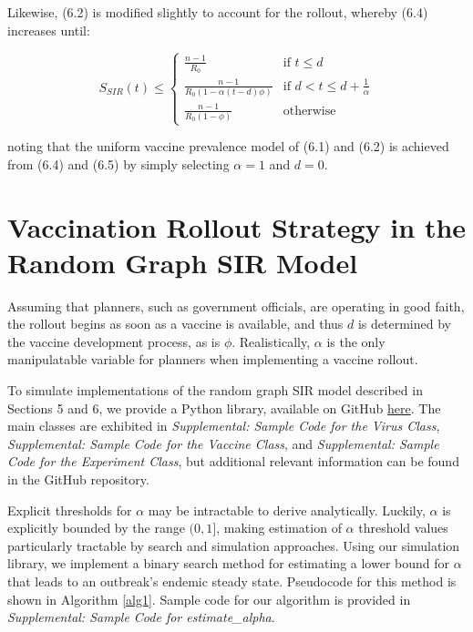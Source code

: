 \documentclass[psamsfonts]{amsart}
\theoremstyle{definition}
\theoremstyle{remark}
\numberwithin{equation}{section}
\begin{document}
Likewise, (6.2) is modified slightly to account for the rollout, whereby (6.4) increases until:

\begin{equation}
S_{SIR}(t) \leq 
	\begin{cases}
		\frac{n-1}{R_0}  & \text{if $t \leq d$} \\
		\frac{n-1}{R_0 (1-\alpha(t-d)\phi)}  & \text{if $d < t \leq d + \frac{1}{\alpha}$} \\
		\frac{n-1}{R_0 (1-\phi)}  & \text{otherwise}
	\end{cases}
\end{equation}

noting that the uniform vaccine prevalence model of (6.1) and (6.2) is achieved from (6.4) and (6.5) by simply selecting $\alpha = 1$ and $d=0$.

\section{Vaccination Rollout Strategy in the Random Graph SIR Model}

Assuming that planners, such as government officials, are operating in good faith, the rollout begins as soon as a vaccine is available, and thus $d$ is determined by the vaccine development process, as is $\phi$. Realistically, $\alpha$ is the only manipulatable variable for planners when implementing a vaccine rollout. 

To simulate implementations of the random graph SIR model described in Sections 5 and 6, we provide a Python library, available on GitHub \href{https://github.com/lucasmccabe/Epidemics-on-Random-Graphs}{here}. The main classes are exhibited in \textit{Supplemental: Sample Code for the Virus Class}, \textit{Supplemental: Sample Code for the Vaccine Class}, and \textit{Supplemental: Sample Code for the Experiment Class}, but additional relevant information can be found in the GitHub repository.

Explicit thresholds for $\alpha$ may be intractable to derive analytically. Luckily, $\alpha$ is explicitly bounded by the range $(0, 1]$, making estimation of $\alpha$ threshold values particularly tractable by search and simulation approaches. Using our simulation library, we implement a binary search method for estimating a lower bound for $\alpha$ that leads to an outbreak's endemic steady state. Pseudocode for this method is shown in Algorithm \ref{alg1}. Sample code for our algorithm is provided in \textit{Supplemental: Sample Code for \textit{estimate\_alpha}}.
\end{document}
